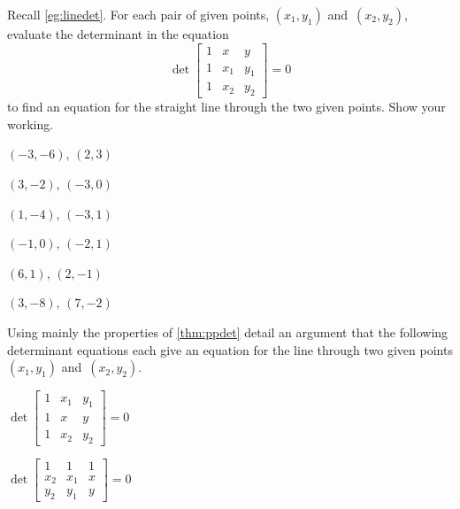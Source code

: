 \begin{exercise} \label{ex:} 
Recall \autoref{eg:linedet}.
For each pair of given points, \((x_1,y_1)\) and~\((x_2,y_2)\), evaluate the determinant in the equation
\begin{equation*}
\det\begin{bmatrix} 1 &x&y\\1&x_1&y_1\\1&x_2&y_2 \end{bmatrix}=0
\end{equation*}
to find an equation for the straight line through the two given points.
Show your working.
\begin{parts}
\item \((-3,-6)\), \((2,3)\)

\item \((3,-2)\), \((-3,0)\)

\item \((1,-4)\), \((-3,1)\)

\item \((-1,0)\), \((-2,1)\)

\item \((6,1)\), \((2,-1)\)

\item \((3,-8)\), \((7,-2)\)

\end{parts}
\end{exercise}




\begin{exercise} \label{ex:} 
Using mainly the properties of \autoref{thm:ppdet} detail an argument that the following determinant equations each give an equation for the line through two given points \((x_1,y_1)\) and~\((x_2,y_2)\).
\begin{parts}
\item \(\det\begin{bmatrix} 1&x_1&y_1
\\1&x&y
\\1&x_2&y_2 \end{bmatrix}=0\)

\item \(\det\begin{bmatrix} 1&1&1
\\x_2&x_1&x
\\y_2&y_1&y \end{bmatrix}=0\)

\end{parts}
\end{exercise}





